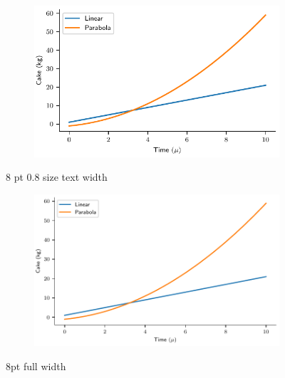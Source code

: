 \documentclass[a4paper,11pt]{report} %
\numberwithin{equation}{section}
\begin{document}
\begin{figure}
\centering
\begin{subfigure}{0.8\textwidth}
	\centering
	\includegraphics[width=1\linewidth]{fig/OneGoldenSmall.pdf}
\end{subfigure}
\caption{8 pt 0.8 size text width}
\end{figure}

\begin{figure}
\centering
\begin{subfigure}{0.99\textwidth}
	\centering
	\includegraphics[width=1\linewidth]{fig/OneGoldenFull.pdf}
\end{subfigure}
\caption{8pt full width}
\end{figure}
\end{document}
